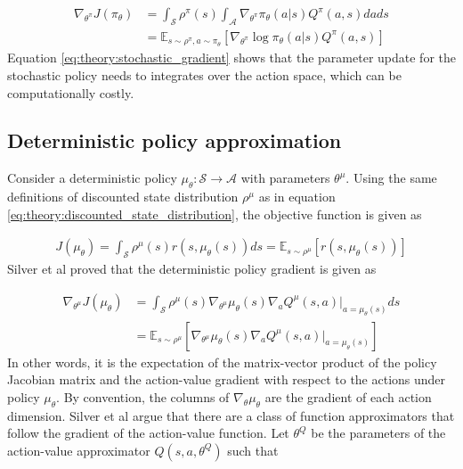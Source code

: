 \documentclass[class=book, crop=false, 11pt]{standalone}
\begin{document}
\begin{equation}
   \begin{aligned}\label{eq:theory:stochastic_gradient}
    \nabla_{\theta^{\pi}} J(\pi_{\theta}) &= 
     \int_{\mathcal{S}}\rho^{\pi}(s)
     \int_{\mathcal{A}} \nabla_{\theta^{\pi}} \pi_{\theta}(a|s)Q^{\pi}(a,s)da ds
     \\
     &= \mathbb{E}_{s\sim \rho^{\pi},a \sim \pi_{\theta}}
     [\nabla_{\theta^{\pi}} \log \pi_{\theta}(a|s)Q^{\pi}(a,s) ]
\end{aligned} 
\end{equation}
Equation \eqref{eq:theory:stochastic_gradient} shows that the parameter update for the stochastic policy needs to integrates over the action space, which can be computationally costly.

\subsection{Deterministic policy approximation}
Consider a deterministic policy $\mu_{\theta}: \mathcal{S} \to \mathcal{A}$ with parameters $\theta^{\mu}$. Using the same definitions of discounted state distribution $\rho^{\mu}$ as in equation
\eqref{eq:theory:discounted_state_distribution}, the objective function is given as 

\begin{equation}
   \begin{aligned}\label{eq:theory:objective_expected_deterministic}
    J(\mu_{\theta}) =
    \int_{\mathcal{S}}
    \rho^{\mu}(s)r(s,\mu_{\theta}(s)) ds = \mathbb{E}_{s\sim \rho^{\mu}}[r(s,\mu_{\theta}(s))]
\end{aligned} 
\end{equation}
Silver et al \cite{pmlr-v32-silver14} proved that the deterministic policy gradient is given as 

\begin{equation}
   \begin{aligned}\label{eq:theory:objective_gradient_deterministic}
    \nabla_{\theta^{\mu}}J(\mu_{\theta}) &=
    \int_{\mathcal{S}}
    \rho^{\mu}(s)
    \nabla_{\theta^{\mu}} \mu_{\theta}(s)
    \nabla_{a} Q^{\mu}(s,a)|_{a = \mu_{\theta}(s)}ds 
    \\
    &= \mathbb{E}_{s\sim \rho^{\mu}}
    [    \nabla_{\theta^{\mu}} \mu_{\theta}(s)
    \nabla_{a} Q^{\mu}(s,a)|_{a = \mu_{\theta}(s)}]
\end{aligned} 
\end{equation}
In other words, it is the expectation of the matrix-vector product of the policy Jacobian matrix and the action-value gradient with respect to the actions under policy $\mu_{\theta}$. By convention, the columns of $\nabla_{\theta} \mu_{\theta}$ are the gradient of each action dimension. Silver et al argue that there are a class of function approximators that follow the gradient of the action-value function. Let $\theta^{Q}$ be the parameters of the action-value approximator $Q(s,a,\theta^{Q})$ such that   
\end{document}
